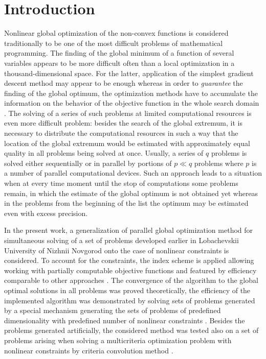 \documentclass[runningheads]{llncs}
\begin{document}
\section{Introduction}
\label{sec-intro}
Nonlinear global optimization of the non-convex functions is considered traditionally to be one
of the most difficult problems of mathematical programming.
 The finding of the global minimum of a function of several variables appears to be more
difficult often than a local optimization in a thousand-dimensional space.
For the latter, application of the simplest gradient descent method may appear to be enough
whereas in order to \textit{guarantee} the finding of the global optimum, the optimization
methods have to accumulate the information on the behavior of the objective function in the
whole search domain \cite{Jones2009,Paulavicius2011,Evtushenko2013,Strongin2000}.
The solving of a series of such problems at limited computational resources is even more
difficult problem: besides the search of the global extremum, it is necessary to distribute the
computational resources in such a way that the location of the global extremum would be
estimated with approximately equal quality in all problems being solved at once.
Usually, a series of \(q\) problems is solved either sequentially or in parallel by portions of \(p\ll
q\) problems where \(p\) is a number of parallel computational devices.
Such an approach leads to a situation when at every time moment until the stop of computations
some problems remain, in which the estimate of the global optimum is not obtained yet whereas
in the problems from the beginning of the list the optimum may be estimated even with excess
precision.

In the present work, a generalization of parallel global optimization method for simultaneous
solving of a set of problems developed earlier in Lobachevskii University of Nizhnii Novgorod
\cite{BarkalovStrongin2018} onto the case of nonlinear constraints is considered. To account
for the constraints, the index scheme \cite{Strongin2000} is applied allowing working with
partially computable objective functions and featured by efficiency comparable to other
approaches \cite{BarkalovLebedev2017}. The convergence of the algorithm to the global
optimal solutions in all problems was proved theoretically, the efficiency of the implemented
algorithm was demonstrated by solving sets of problems generated by a special mechanism
generating the sets of problems of predefined dimensionality with predefined number of
nonlinear constraints \cite{GergelBarkalov2019}.
Besides the problems generated artificially, the considered method was tested also on a set of
problems arising when solving a multicriteria optimization problem with nonlinear constraints by
criteria convolution method \cite{Ehrgott2005}.
\end{document}
